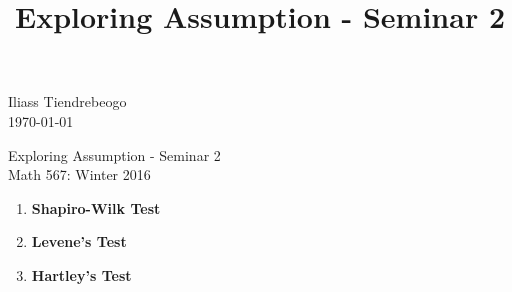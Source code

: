 \documentclass{article}[12pt]
\begin{document}
\begin{center}


\title{Exploring Assumption - Seminar 2}
\hfill Iliass Tiendrebeogo\\

\hfill \today\\
\end{center}
\bigskip

\begin{center}
  \begin{Large}
      
    Exploring Assumption - Seminar 2 \\
    Math 567: Winter 2016 \\
       
  \end{Large}
\end{center}

\bigskip
\begin{enumerate}
\item %
{\bf Shapiro-Wilk Test}
\item %
{ \bf Levene's Test}
\item %
{\bf Hartley's Test}
\end{enumerate}
\end{document}
